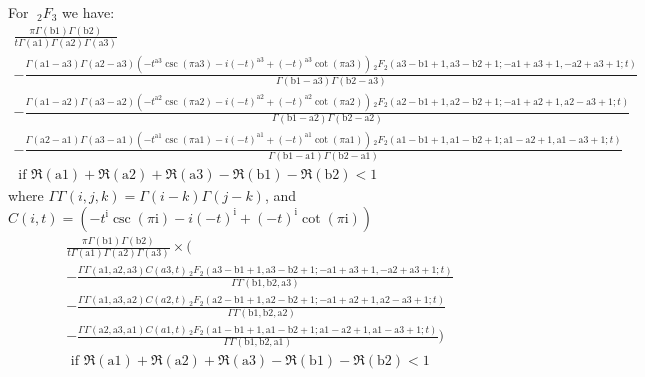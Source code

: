 \documentclass[journal=jcisd8,manuscript=article,layout=onecolumn,pdftex,floatfix,amsmath,amssymb,10pt]{achemso}
\begin{document}
For $\;_2F_3$ we have:
\begin{align}
\frac{\pi \Gamma (\text{b1}) \Gamma (\text{b2}) }{t \Gamma (\text{a1}) \Gamma (\text{a2}) \Gamma (\text{a3})}
\\ -\frac{ \Gamma (\text{a1}-\text{a3}) \Gamma (\text{a2}-\text{a3}) \left(-t^{\text{a3}} \csc (\pi  \text{a3})-i (-t)^{\text{a3}}+(-t)^{\text{a3}} \cot (\pi
    \text{a3})\right) \, _2F_2(\text{a3}-\text{b1}+1,\text{a3}-\text{b2}+1;-\text{a1}+\text{a3}+1,-\text{a2}+\text{a3}+1;t)}{ \Gamma (\text{b1}-\text{a3}) \Gamma
    (\text{b2}-\text{a3})}
\\ -\frac{ \Gamma (\text{a1}-\text{a2}) \Gamma (\text{a3}-\text{a2}) \left(-t^{\text{a2}} \csc (\pi  \text{a2})-i (-t)^{\text{a2}}+(-t)^{\text{a2}} \cot (\pi
    \text{a2})\right) \, _2F_2(\text{a2}-\text{b1}+1,\text{a2}-\text{b2}+1;-\text{a1}+\text{a2}+1,\text{a2}-\text{a3}+1;t)}{\Gamma (\text{b1}-\text{a2}) \Gamma
    (\text{b2}-\text{a2})}
\\ -\frac{ \Gamma (\text{a2}-\text{a1}) \Gamma (\text{a3}-\text{a1}) \left(-t^{\text{a1}} \csc (\pi  \text{a1})-i (-t)^{\text{a1}}+(-t)^{\text{a1}} \cot (\pi
    \text{a1})\right) \, _2F_2(\text{a1}-\text{b1}+1,\text{a1}-\text{b2}+1;\text{a1}-\text{a2}+1,\text{a1}-\text{a3}+1;t)}{\Gamma (\text{b1}-\text{a1}) \Gamma
    (\text{b2}-\text{a1})}    
\\ \text{ if }\Re(\text{a1})+\Re(\text{a2})+\Re(\text{a3})-\Re(\text{b1})-\Re(\text{b2})<1
\end{align}
where $\Gamma\Gamma(i,j,k) = \Gamma(i-k)\Gamma(j-k)$, and $C(i,t) = \left(-t^{\text{i}} \csc (\pi  \text{i})-i (-t)^{\text{i}}+(-t)^{\text{i}} \cot (\pi\text{i})\right)$
\begin{align}
\frac{\pi \Gamma (\text{b1}) \Gamma (\text{b2}) }{t \Gamma (\text{a1}) \Gamma (\text{a2}) \Gamma (\text{a3})} \times \bigg(
\\ -\frac{ \Gamma\Gamma(\text{a1},\text{a2},\text{a3}) C(a3,t) \, _2F_2(\text{a3}-\text{b1}+1,\text{a3}-\text{b2}+1;-\text{a1}+\text{a3}+1,-\text{a2}+\text{a3}+1;t)}{ \Gamma\Gamma(\text{b1},\text{b2},\text{a3})}
\\ -\frac{ \Gamma\Gamma(\text{a1},\text{a3},\text{a2}) C(a2,t) \, _2F_2(\text{a2}-\text{b1}+1,\text{a2}-\text{b2}+1;-\text{a1}+\text{a2}+1,\text{a2}-\text{a3}+1;t)}{\Gamma\Gamma(\text{b1},\text{b2},\text{a2})}
\\ -\frac{ \Gamma\Gamma(\text{a2},\text{a3},\text{a1}) C(a1,t) \, _2F_2(\text{a1}-\text{b1}+1,\text{a1}-\text{b2}+1;\text{a1}-\text{a2}+1,\text{a1}-\text{a3}+1;t)}{\Gamma\Gamma(\text{b1},\text{b2},\text{a1})} \bigg)   
\\ \text{ if }\Re(\text{a1})+\Re(\text{a2})+\Re(\text{a3})-\Re(\text{b1})-\Re(\text{b2})<1
\end{align}
\end{document}
